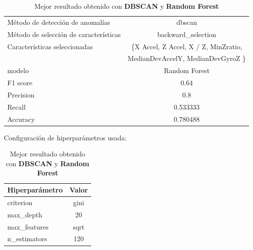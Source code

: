\begin{appendices}
		\begin{table}[htb]
			\centering
			\caption{Mejor resultado obtenido con \textbf{DBSCAN} y \textbf{Random Forest}}
			\label{table:35}
			\begin{tabular}{lc}
				\toprule
				\midrule
					  Método de detección de anomalías &                                             dbscan \\
				Método de selección de características &                                 backward\_selection \\
						 Características seleccionadas & \{X Accel, Z Accel, X / Z, MinZratio, \\
						                               &        MedianDevAccelY, MedianDevGyroZ \} \\
												modelo &                                      Random Forest \\
											  F1 score &                                               0.64 \\
											 Precision &                                                0.8 \\
												Recall &                                           0.533333 \\
											  Accuracy &                                           0.780488 \\
				\bottomrule
			\end{tabular}
			\newline
			\newline
			Configuración de hiperparámetros usada:
			\begin{tabular}{lc}
				\toprule
				Hiperparámetro & Valor \\
				\midrule
					 criterion &  gini \\
					 max\_depth &    20 \\
				  max\_features &  sqrt \\
				  n\_estimators &   120 \\
				\bottomrule
			\end{tabular}
			

		\end{table}


\end{appendices}
